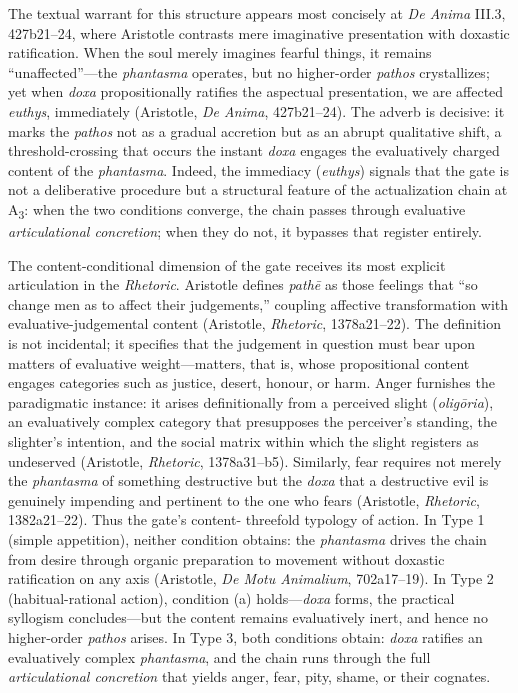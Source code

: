 \documentclass{article}
\begin{document}
The textual warrant for this structure appears most concisely at \textit{De Anima} III.3, 427b21--24, where Aristotle contrasts mere imaginative presentation with doxastic ratification. When the soul merely imagines fearful things, it remains ``unaffected''---the \textit{phantasma} operates, but no higher-order \textit{pathos} crystallizes; yet when \textit{doxa} propositionally ratifies the aspectual presentation, we are affected \textit{euthys}, immediately (Aristotle, \textit{De Anima}, 427b21--24). The adverb is decisive: it marks the \textit{pathos} not as a gradual accretion but as an abrupt qualitative shift, a threshold-crossing that occurs the instant \textit{doxa} engages the evaluatively charged content of the \textit{phantasma}. Indeed, the immediacy (\textit{euthys}) signals that the gate is not a deliberative procedure but a structural feature of the actualization chain at A\textsubscript{3}: when the two conditions converge, the chain passes through evaluative \textit{articulational concretion}; when they do not, it bypasses that register entirely.

The content-conditional dimension of the gate receives its most explicit articulation in the \textit{Rhetoric}. Aristotle defines \textit{pathē} as those feelings that ``so change men as to affect their judgements,'' coupling affective transformation with evaluative-judgemental content (Aristotle, \textit{Rhetoric}, 1378a21--22). The definition is not incidental; it specifies that the judgement in question must bear upon matters of evaluative weight---matters, that is, whose propositional content engages categories such as justice, desert, honour, or harm. Anger furnishes the paradigmatic instance: it arises definitionally from a perceived slight (\textit{oligōria}), an evaluatively complex category that presupposes the perceiver's standing, the slighter's intention, and the social matrix within which the slight registers as undeserved (Aristotle, \textit{Rhetoric}, 1378a31--b5). Similarly, fear requires not merely the \textit{phantasma} of something destructive but the \textit{doxa} that a destructive evil is genuinely impending and pertinent to the one who fears (Aristotle, \textit{Rhetoric}, 1382a21--22). Thus the gate's content- threefold typology of action. In Type 1 (simple appetition), neither condition obtains: the \textit{phantasma} drives the chain from desire through organic preparation to movement without doxastic ratification on any axis (Aristotle, \textit{De Motu Animalium}, 702a17--19). In Type 2 (habitual-rational action), condition (a) holds---\textit{doxa} forms, the practical syllogism concludes---but the content remains evaluatively inert, and hence no higher-order \textit{pathos} arises. In Type 3, both conditions obtain: \textit{doxa} ratifies an evaluatively complex \textit{phantasma}, and the chain runs through the full \textit{articulational concretion} that yields anger, fear, pity, shame, or their cognates.
\end{document}
